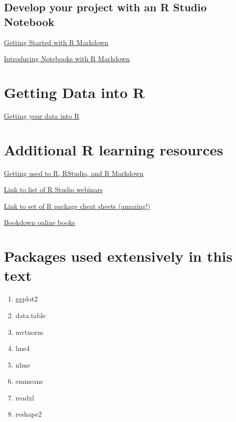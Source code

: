 \documentclass[]{book}
\providecommand{\tightlist}{%
  \setlength{\itemsep}{0pt}\setlength{\parskip}{0pt}}
\theoremstyle{definition}
\theoremstyle{definition}
\theoremstyle{definition}
\theoremstyle{remark}
\begin{document}
\subsection{Develop your project with an R Studio
Notebook}\label{develop-your-project-with-an-r-studio-notebook}

\href{https://www.rstudio.com/resources/webinars/getting-started-with-r-markdown/}{Getting
Started with R Markdown}

\href{https://www.rstudio.com/resources/webinars/introducing-notebooks-with-r-markdown/}{Introducing
Notebooks with R Markdown}

\section{Getting Data into R}\label{getting-data-into-r}

\href{https://www.rstudio.com/resources/webinars/getting-your-data-into-r/}{Getting
your data into R}

\section{Additional R learning
resources}\label{additional-r-learning-resources}

\href{https://bookdown.org/chesterismay/rbasics/}{Getting used to R,
RStudio, and R Markdown}

\href{https://www.rstudio.com/resources/webinars/}{Link to list of R
Studio webinars}

\href{https://www.rstudio.com/resources/cheatsheets/}{Link to set of R
package cheat sheets (amazing!)}

\href{https://bookdown.org}{Bookdown online books}

\section{Packages used extensively in this
text}\label{packages-used-extensively-in-this-text}

\begin{enumerate}
\def\labelenumi{\arabic{enumi}.}
\tightlist
\item
  ggplot2
\item
  data.table
\item
  mvtnorm
\item
  lme4
\item
  nlme
\item
  emmeans
\item
  readxl
\item
  reshape2
\end{enumerate}
\end{document}
